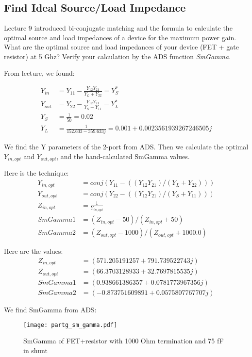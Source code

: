\subsection{Find Ideal Source/Load Impedance}
{\color{blue} Lecture 9 introduced bi-conjugate matching and the formula to calculate the optimal source and load impedances of a device for the maximum power gain.
What are the optimal source and load impedances of your device (FET + gate resistor) at 5 Ghz?
Verify your calculation by the ADS function \emph{SmGamma}.}

From lecture, we found:

\begin{align*}
    Y_{in} &= Y_{11} - \frac{Y_{12}Y_{21}}{Y_L + Y_{22}} = Y_S^* \\
    Y_{out} &= Y_{22} - \frac{Y_{12}Y_{21}}{Y_S + Y_{11}} = Y_L^* \\
    Y_S &= \frac{1}{50} = 0.02 \\
    Y_L &= \frac{1}{152.633-359.633j} = 0.001+0.0023561939267246505j
\end{align*}

We find the Y parameters of the 2-port from ADS. Then we calculate the optimal $Y_{in,opt}$ and $Y_{out,opt}$, and the hand-calculated SmGamma values.

Here is the technique:
\begin{align*}
    Y_{in,opt} &= conj(Y_{11} - ((Y_{12}Y_{21}) / (Y_L + Y_{22}))) \\
    Y_{out,opt} &= conj(Y_{22} - ((Y_{12}Y_{21}) / (Y_S + Y_{11}))) \\
    Z_{in,opt} &= \frac{1}{Y_{in,opt}} \\
    SmGamma1 &= (Z_{in,opt} - 50) / (Z_{in,opt} + 50) \\
    SmGamma2 &= (Z_{out,opt} - 1000) / (Z_{out,opt} + 1000.0)
\end{align*}

Here are the values:
\begin{align*}
    Z_{in,opt} &= (571.205191257+791.739522743j) \\
    Z_{out,opt} &= (66.3703128933+32.7697815535j) \\
    SmGamma1 &= (0.938661386357+0.0781773967356j) \\
    SmGamma2 &= (-0.873751609891+0.0575807767707j)
\end{align*}

We find SmGamma from ADS:
\begin{figure}[H]
    \centering \texttt{[image: partg\_sm\_gamma.pdf]}
    \caption{SmGamma of FET+resistor with 1000 Ohm termination and 75 fF in shunt}
\end{figure}

